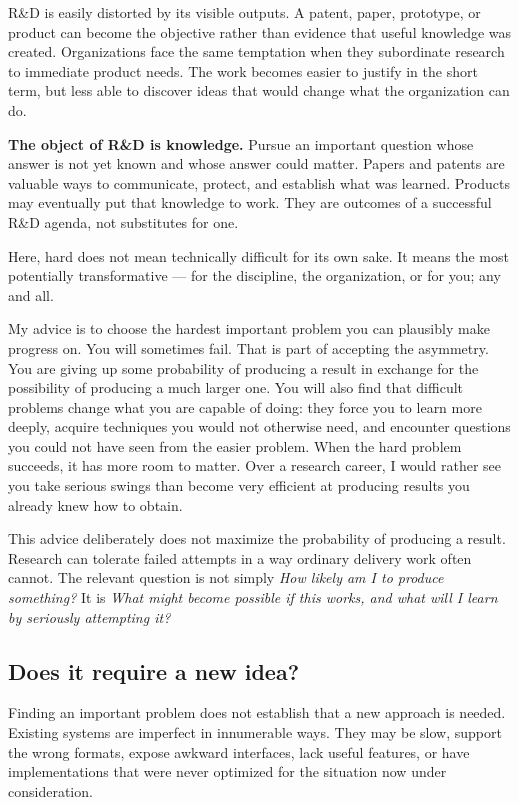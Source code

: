 R\&D is easily distorted by its visible outputs. A patent, paper, prototype, or product can become
the objective rather than evidence that useful knowledge was created. Organizations face the same
temptation when they subordinate research to immediate product needs. The work becomes easier to
justify in the short term, but less able to discover ideas that would change what the organization
can do.

\textbf{The object of R\&D is knowledge.} Pursue an important question whose answer is not yet known and
whose answer could matter. Papers and patents are valuable ways to communicate, protect, and
establish what was learned. Products may eventually put that knowledge to work. They are outcomes
of a successful R\&D agenda, not substitutes for one.

Here, hard does not mean technically difficult for its own sake. It means the most potentially
transformative --- for the discipline, the organization, or for you; any and all.

My advice is to choose the hardest important problem you can plausibly make progress on. You will
sometimes fail. That is part of accepting the asymmetry. You are giving up some probability of
producing a result in exchange for the possibility of producing a much larger one. You will also
find that difficult problems change what you are capable of doing: they force you to learn more
deeply, acquire techniques you would not otherwise need, and encounter questions you could not have
seen from the easier problem. When the hard problem succeeds, it has more room to matter. Over a
research career, I would rather see you take serious swings than become very efficient at producing
results you already knew how to obtain.

This advice deliberately does not maximize the probability of producing a result. Research can
tolerate failed attempts in a way ordinary delivery work often cannot. The relevant question is not
simply \emph{How likely am I to produce something?} It is \emph{What might become possible if this works, and
what will I learn by seriously attempting it?}

\subsection{Does it require a new idea?}\label{sec-new-idea}

Finding an important problem does not establish that a new approach is needed. Existing systems are
imperfect in innumerable ways. They may be slow, support the wrong formats, expose awkward
interfaces, lack useful features, or have implementations that were never optimized for the
situation now under consideration.


